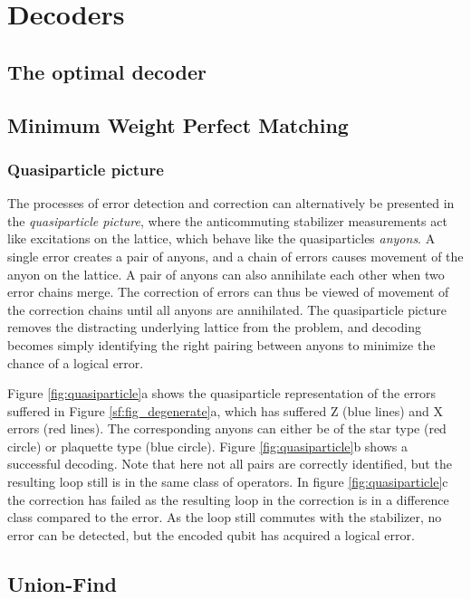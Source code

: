 
\chapter{Decoders}\label{sec:surface_decoders}
\section{The optimal decoder}\label{sec:optimal_decoder}
\section{Minimum Weight Perfect Matching}\label{sec:MWPMdecoder}

\subsection{Quasiparticle picture}
The processes of error detection and correction can alternatively be presented in the \emph{quasiparticle picture}, where the anticommuting stabilizer measurements act like excitations on the lattice, which behave like the quasiparticles \emph{anyons}. A single error creates a pair of anyons, and a chain of errors causes movement of the anyon on the lattice. A pair of anyons can also annihilate each other when two error chains merge. The correction of errors can thus be viewed of movement of the correction chains until all anyons are annihilated. The quasiparticle picture removes the distracting underlying lattice from the problem, and decoding becomes simply identifying the right pairing between anyons to minimize the chance of a logical error.

Figure \ref{fig:quasiparticle}a shows the quasiparticle representation of the errors suffered in Figure \ref{sf:fig_degenerate}a, which has suffered Z (blue lines) and X errors (red lines). The corresponding anyons can either be of the star type (red circle) or plaquette type (blue circle). Figure \ref{fig:quasiparticle}b shows a successful decoding. Note that here not all pairs are correctly identified, but the resulting loop still is in the same class of operators. In figure \ref{fig:quasiparticle}c the correction has failed as the resulting loop in the correction is in a difference class compared to the error. As the loop still commutes with the stabilizer, no error can be detected, but the encoded qubit has acquired a logical error.


\section{Union-Find}\label{sec:UFdecoder}


